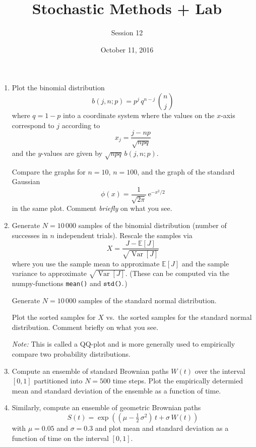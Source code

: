 \documentclass[12pt]{article}
\begin{document}
\title{Stochastic Methods + Lab}
\author{Session 12}
\date{October 11, 2016}
\maketitle

\begin{enumerate}


\item Plot the binomial distribution 
\[
  b(j,n;p) = p^j \, q^{n-j} \, \binom{n}{j}
\]
where $q=1-p$ into a coordinate system where the values on the
$x$-axis correspond to $j$ according to
\[
  x_j = \frac{j-np}{\sqrt{npq}}
\]
and the $y$-values are given by $\sqrt{npq}\, b(j,n;p)$.

Compare the graphs for $n=10$, $n=100$, and the graph of the standard
Gaussian
\[
  \phi(x) = \frac1{\sqrt{2\pi}} \, \mathrm{e}^{-x^2/2}
\]
in the same plot.  Comment \emph{briefly} on what you see.


\item Generate $N=10\,000$ samples of the binomial distribution
(number of successes in $n$ independent trials).  Rescale the samples
via
\[
  X = \frac{J- \mathbb E[J]}{\sqrt{\operatorname{Var}[J]}}
\]
where you use the sample mean to approximate $\mathbb E[J]$ and the
sample variance to approximate $\sqrt{\operatorname{Var}[J]}$.  (These
can be computed via the \textsf{numpy}-functions \verb+mean()+ and
$\verb+std()+.$)

Generate $N=10\,000$ samples of the standard normal distribution.

Plot the sorted samples for $X$ vs.\ the sorted samples for the
standard normal distribution.  Comment briefly on what you see.  

\emph{Note:} This is called a QQ-plot and is more generally used to
empirically compare two probability distributions.

\item Compute an ensemble of standard Brownian paths $W(t)$ over the
interval $[0,1]$ partitioned into $N=500$ time steps.  Plot the
empirically determied mean and standard deviation of the ensemble as a
function of time.

\item Similarly, compute an ensemble of geometric Brownian paths
\[
  S(t) = \exp((\mu - \tfrac12 \, \sigma^2)\, t + \sigma \, W(t))
\]
with $\mu=0.05$ and $\sigma=0.3$ and plot mean and standard deviation as
a function of time on the interval $[0,1]$.

\end{enumerate}
\end{document}
